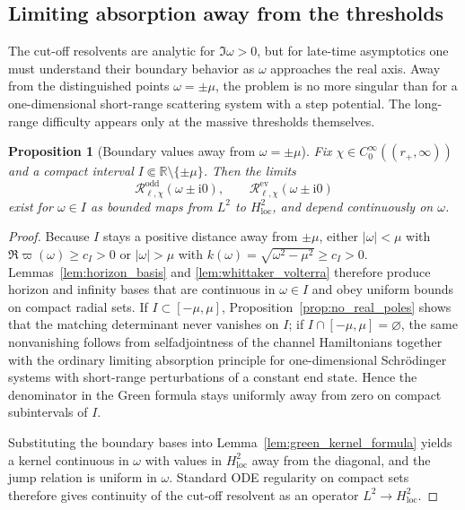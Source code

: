 \documentclass[12pt]{article}
\numberwithin{equation}{section}
\theoremstyle{plain}
\newtheorem{proposition}[theorem]{Proposition}
\theoremstyle{definition}
\theoremstyle{remark}
\newcommand{\R}{\mathbb R}
\newcommand{\ii}{\mathrm i}
\newcommand{\cR}{\mathcal R}
\newcommand{\om}{\omega}
\newcommand{\vp}{\varpi}
\begin{document}
\subsection{Limiting absorption away from the thresholds}

The cut-off resolvents are analytic for $\Im\om>0$, but for late-time asymptotics one must understand their boundary behavior as $\om$ approaches the real axis.  Away from the distinguished points $\om=\pm\mu$, the problem is no more singular than for a one-dimensional short-range scattering system with a step potential.  The long-range difficulty appears only at the massive thresholds themselves.

\begin{proposition}[Boundary values away from $\om=\pm\mu$]\label{prop:boundary_values_away_thresholds}
Fix $\chi\in C_0^\infty((r_+,\infty))$ and a compact interval $I\Subset\R\setminus\{\pm\mu\}$.  Then the limits
\[
   \cR_{\ell,\chi}^{\mathrm{odd}}(\om\pm \ii0),
   \qquad
   \cR_{\ell,\chi}^{\mathrm{ev}}(\om\pm \ii0)
\]
exist for $\om\in I$ as bounded maps from $L^2$ to $H^2_{\mathrm{loc}}$, and depend continuously on $\om$.
\end{proposition}

\begin{proof}
Because $I$ stays a positive distance away from $\pm\mu$, either $|\omega|<\mu$ with $\Re\vp(\omega)\ge c_I>0$ or $|\omega|>\mu$ with $k(\omega)=\sqrt{\omega^2-\mu^2}\ge c_I>0$.  Lemmas~\ref{lem:horizon_basis} and \ref{lem:whittaker_volterra} therefore produce horizon and infinity bases that are continuous in $\omega\in I$ and obey uniform bounds on compact radial sets.  If $I\subset[-\mu,\mu]$, Proposition~\ref{prop:no_real_poles} shows that the matching determinant never vanishes on $I$; if $I\cap[-\mu,\mu]=\varnothing$, the same nonvanishing follows from selfadjointness of the channel Hamiltonians together with the ordinary limiting absorption principle for one-dimensional Schr\"odinger systems with short-range perturbations of a constant end state.  Hence the denominator in the Green formula stays uniformly away from zero on compact subintervals of $I$.

Substituting the boundary bases into Lemma~\ref{lem:green_kernel_formula} yields a kernel continuous in $\omega$ with values in $H^2_{\mathrm{loc}}$ away from the diagonal, and the jump relation is uniform in $\omega$.  Standard ODE regularity on compact sets therefore gives continuity of the cut-off resolvent as an operator $L^2\to H^2_{\mathrm{loc}}$.
\end{proof}
\end{document}
